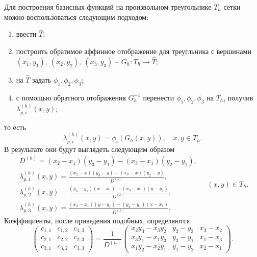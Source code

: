 \documentclass[a4paper,14pt]{extarticle}
\begin{document}
	Для построения базисных функций на произвольном
	треугольнике $T_h$ сетки можно воспользоваться
	следующим подходом:
	\begin{enumerate}
		\item ввести  $\widehat T$;
		
		\item построить обратимое аффинное
		отображение для треугльника с вершинами $(x_1,y_1),~(x_2,y_2),~(x_3,y_3)$ -- 
		$G_h:T_h\to\widehat T$;
		
		\item на $\widehat T$ задать $\phi_1,\phi_2,\phi_3$;
		
		\item с помощью обратного отображения
		$G_h^{-1}$ перенести $\phi_1,\phi_2,\phi_3$
		на  $T_h$,
		получив 
		$\lambda_{p,i}^{(h)}(x,y)$;
	\end{enumerate}
	то есть
	\begin{equation}
		\lambda^{(h)}_{p,i}(x,y) = \phi_i(G_h(x,y)),\quad x,y \in T_h.
	\end{equation}
	В результате они будут выглядеть следующим образом
	\begin{equation}
	\begin{gathered}
	D^{(h)} = (x_2 - x_1)(y_3 - y_1) - (x_3 - x_1)(y_2 - y_1),
	\\
	\lambda_{p,1}^{(h)}(x,y) =
	\frac{(x_2 - x)(y_3 - y) - (x_3 - x)(y_2 - y)}{D^{(h)}},
	\\
	\lambda_{p,2}^{(h)}(x,y) =
	\frac{(y_3 - y_1)(x - x_1) - (x_3 - x_1)(y - y_1)}{D^{(h)}},
	\\
	\lambda_{p,3}^{(h)}(x,y) =
	\frac{(x_2 - x_1)(y - y_1) - (y_2 - y_1)(x - x_1)}{D^{(h)}},
	\end{gathered}
	\quad (x,y) \in T_h.
	\end{equation}
	Коэффициенты, после приведения подобных, определяются
	\begin{equation}
		\begin{pmatrix}
			c_{1,1} & c_{1,2} & c_{1,3}\\
			c_{2,1} & c_{2,2} & c_{2,3}\\
			c_{3,1} & c_{3,2} & c_{3,3}
		\end{pmatrix}
		=
		\frac{1}{D^{(h)}}
		\begin{pmatrix}
			x_2y_3-x_3y_2 & y_2-y_3 & x_3-x_2\\
			x_3y_1-x_1y_3 & y_3-y_1 & x_1-x_3\\
			x_1y_2-x_2y_1 & y_1-y_2 & x_2-x_1
		\end{pmatrix}.
	\end{equation}
\end{document}
